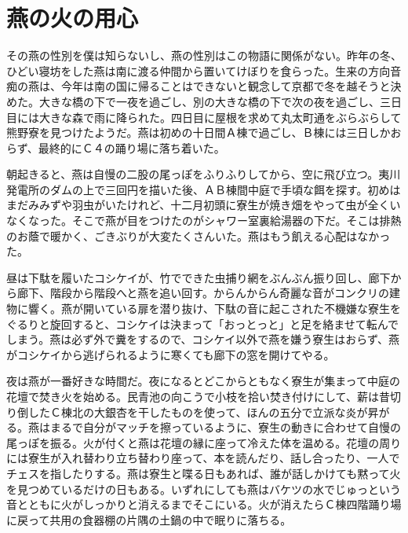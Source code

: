 \section{燕の火の用心}\label{sec:tubame}


  その燕の性別を僕は知らないし、燕の性別はこの物語に関係がない。昨年の冬、ひどい寝坊をした燕は南に渡る仲間から置いてけぼりを食らった。生来の方向音痴の燕は、今年は南の国に帰ることはできないと観念して京都で冬を越そうと決めた。大きな橋の下で一夜を過ごし、別の大きな橋の下で次の夜を過ごし、三日目には大きな森で雨に降られた。四日目に屋根を求めて丸太町通をぶらぶらして熊野寮を見つけたようだ。燕は初めの十日間Ａ棟で過ごし、Ｂ棟には三日しかおらず、最終的にＣ４の踊り場に落ち着いた。
  
  朝起きると、燕は自慢の二股の尾っぽをふりふりしてから、空に飛び立つ。夷川発電所のダムの上で三回円を描いた後、ＡＢ棟間中庭で手頃な餌を探す。初めはまだみみずや羽虫がいたけれど、十二月初頭に寮生が焼き畑をやって虫が全くいなくなった。そこで燕が目をつけたのがシャワー室裏給湯器の下だ。そこは排熱のお蔭で暖かく、ごきぶりが大変たくさんいた。燕はもう飢える心配はなかった。

  昼は下駄を履いたコシケイが、竹でできた虫捕り網をぶんぶん振り回し、廊下から廊下、階段から階段へと燕を追い回す。からんからん奇麗な音がコンクリの建物に響く。燕が開いている扉を潜り抜け、下駄の音に起こされた不機嫌な寮生をぐるりと旋回すると、コシケイは決まって「おっとっと」と足を絡ませて転んでしまう。燕は必ず外で糞をするので、コシケイ以外で燕を嫌う寮生はおらず、燕がコシケイから逃げられるように寒くても廊下の窓を開けてやる。

  夜は燕が一番好きな時間だ。夜になるとどこからともなく寮生が集まって中庭の花壇で焚き火を始める。民青池の向こうで小枝を拾い焚き付けにして、薪は昔切り倒したＣ棟北の大銀杏を干したものを使って、ほんの五分で立派な炎が昇がる。燕はまるで自分がマッチを擦っているように、寮生の動きに合わせて自慢の尾っぽを振る。火が付くと燕は花壇の縁に座って冷えた体を温める。花壇の周りには寮生が入れ替わり立ち替わり座って、本を読んだり、話し合ったり、一人でチェスを指したりする。燕は寮生と喋る日もあれば、誰が話しかけても黙って火を見つめているだけの日もある。いずれにしても燕はバケツの水でじゅっという音とともに火がしっかりと消えるまでそこにいる。火が消えたらＣ棟四階踊り場に戻って共用の食器棚の片隅の土鍋の中で眠りに落ちる。

